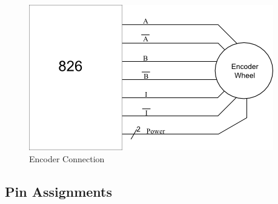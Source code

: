 \documentclass[12pt]{article}
\begin{document}
\clearpage

\begin{figure}[h]
\centering
\includegraphics[scale=0.8]{connections}
\caption{Encoder Connection}
\end{figure}


\subsection{Pin Assignments}
\end{document}
